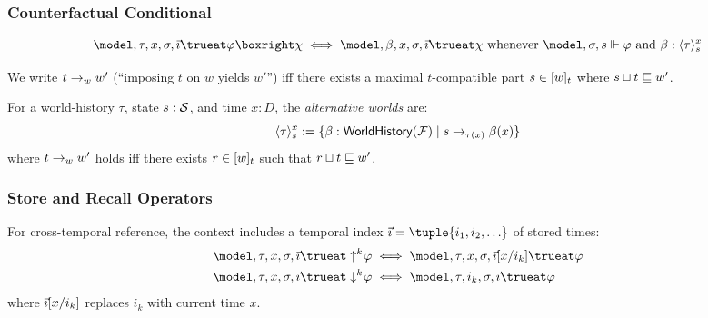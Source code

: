 \documentclass[../LogosReference.tex]{subfiles}
\begin{document}
\subsubsection{Counterfactual Conditional}

\begin{definition}\label{def:counterfactual-truth}
	\[
    \model, \tau, x, \assignment, \tempindex \trueat \metaA \boxright \metaC \iff \model, \beta, x, \assignment, \tempindex \trueat \metaC \text{ whenever } \model, \assignment, s \verifies \metaA \text{ and } \beta : \altworlds{\tau}{s}{x}
	\]
\end{definition}

\begin{definition}[Imposition]\label{def:imposition}
We write $t \to_{w}{w'}$ (``imposing $t$ on $w$ yields $w'$'') iff there exists a maximal $t$-compatible part $s \in [w]_{t}$ where $s\sqcup t \sqsubseteq w'$.
\end{definition}

\begin{definition}\label{def:altworlds}
For a world-history $\tau$, state $s : \mathcal{S}$, and time $x : D$, the \emph{alternative worlds} are:
\[
    \langle \tau \rangle_{s}^{x} := \{\beta : \mathsf{WorldHistory}(\mathcal{F}) \mid s \to_{\tau(x)}{\beta(x)}\}
\]
where $t \to_{w}{w'}$ holds iff there exists $r \in [w]_{t}$ such that $r\sqcup t \sqsubseteq w'$.
\end{definition}

\subsubsection{Store and Recall Operators}

\begin{definition}\label{def:store-recall-truth}
	For cross-temporal reference, the context includes a temporal index $\tempindex = \tuple{i_1, i_2, \ldots}$ of stored times:
	\begin{align}
		\model, \tau, x, \assignment, \tempindex \trueat \store{k}\metaA  & \iff \model, \tau, x, \assignment, \tempindex[x/i_k] \trueat \metaA \\
		\model, \tau, x, \assignment, \tempindex \trueat \recall{k}\metaA & \iff \model, \tau, i_k, \assignment, \tempindex \trueat \metaA
	\end{align}
	where $\vec{\imath}[x/i_k]$ replaces $i_k$ with current time $x$.
\end{definition}
\end{document}
